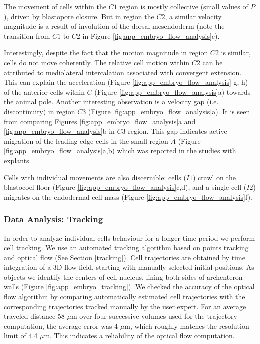The movement of cells within the $C1$ region is mostly collective (small values of $P$), driven by blastopore closure. But in region the $C2$, a similar velocity magnitude is a result of involution of the dorsal mesendoderm (note the transition from $C1$ to $C2$ in Figure \ref{fig:app_embryo_flow_analysis}c).

Interestingly, despite the fact that the motion magnitude in region $C2$ is similar, cells do not move coherently. The relative cell motion within
$C2$ can be attributed to mediolateral intercalation associated with
convergent extension. This can explain the acceleration (Figure \ref{fig:app_embryo_flow_analysis} g, h) of
the anterior cells within $C$ (Figure \ref{fig:app_embryo_flow_analysis}a) towards the animal pole. Another interesting observation is a velocity gap (i.e. discontinuity) in region $C3$ (Figure \ref{fig:app_embryo_flow_analysis}a). It is seen from comparing Figures \ref{fig:app_embryo_flow_analysis}a and \ref{fig:app_embryo_flow_analysis}b in $C3$ region. This gap indicates active migration of the leading-edge cells in the
small region $A$ (Figure \ref{fig:app_embryo_flow_analysis}a,b) which was reported in the studies with explants.

Cells with individual movements are also discernible:  cells ($I1$) crawl on the blastocoel
floor (Figure \ref{fig:app_embryo_flow_analysis}c,d), and a single cell
($I2$) migrates on the endodermal cell mass (Figure \ref{fig:app_embryo_flow_analysis}f). 



\subsubsection{Data Analysis: Tracking}
\label{embryo_tracking}

In order to analyze individual cells behaviour for a longer time period we perform cell tracking. We use an automated tracking algorithm based on points tracking and optical flow (See Section \ref{tracking}).  Cell trajectories are obtained by time integration of a 3D flow field, starting with manually selected initial positions. As objects we identify the centers of  cell nucleus, lining both sides of archenteron walls (Figure \ref{fig:app_embryo_tracking}). We checked the accuracy of the optical flow algorithm by comparing automatically estimated cell trajectories with the corresponding trajectories tracked manually by the user expert. For an average traveled distance 58 $\mu$m over four successive volumes used for the trajectory computation, the average error was 4 $\mu$m, which roughly matches the resolution limit of 4.4 $\mu$m. This indicates a reliability of the optical flow computation.

